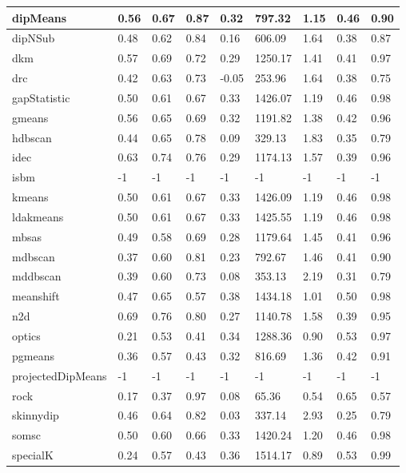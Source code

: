 \begin{table}[H]
\begin{tabular}{|l|l|l|l|l|l|l|l|l|}
dipMeans & 0.56 & 0.67 & 0.87 & 0.32 & 797.32 & 1.15 & 0.46 & 0.90 \\
\hline
dipNSub & 0.48 & 0.62 & 0.84 & 0.16 & 606.09 & 1.64 & 0.38 & 0.87 \\
\hline
dkm & 0.57 & 0.69 & 0.72 & 0.29 & 1250.17 & 1.41 & 0.41 & 0.97 \\
\hline
drc & 0.42 & 0.63 & 0.73 & -0.05 & 253.96 & 1.64 & 0.38 & 0.75 \\
\hline
gapStatistic & 0.50 & 0.61 & 0.67 & 0.33 & 1426.07 & 1.19 & 0.46 & 0.98 \\
\hline
gmeans & 0.56 & 0.65 & 0.69 & 0.32 & 1191.82 & 1.38 & 0.42 & 0.96 \\
\hline
hdbscan & 0.44 & 0.65 & 0.78 & 0.09 & 329.13 & 1.83 & 0.35 & 0.79 \\
\hline
idec & 0.63 & 0.74 & 0.76 & 0.29 & 1174.13 & 1.57 & 0.39 & 0.96 \\
\hline
isbm & -1 & -1 & -1 & -1 & -1 & -1 & -1 & -1 \\
\hline
kmeans & 0.50 & 0.61 & 0.67 & 0.33 & 1426.09 & 1.19 & 0.46 & 0.98 \\
\hline
ldakmeans & 0.50 & 0.61 & 0.67 & 0.33 & 1425.55 & 1.19 & 0.46 & 0.98 \\
\hline
mbsas & 0.49 & 0.58 & 0.69 & 0.28 & 1179.64 & 1.45 & 0.41 & 0.96 \\
\hline
mdbscan & 0.37 & 0.60 & 0.81 & 0.23 & 792.67 & 1.46 & 0.41 & 0.90 \\
\hline
mddbscan & 0.39 & 0.60 & 0.73 & 0.08 & 353.13 & 2.19 & 0.31 & 0.79 \\
\hline
meanshift & 0.47 & 0.65 & 0.57 & 0.38 & 1434.18 & 1.01 & 0.50 & 0.98 \\
\hline
n2d & 0.69 & 0.76 & 0.80 & 0.27 & 1140.78 & 1.58 & 0.39 & 0.95 \\
\hline
optics & 0.21 & 0.53 & 0.41 & 0.34 & 1288.36 & 0.90 & 0.53 & 0.97 \\
\hline
pgmeans & 0.36 & 0.57 & 0.43 & 0.32 & 816.69 & 1.36 & 0.42 & 0.91 \\
\hline
projectedDipMeans & -1 & -1 & -1 & -1 & -1 & -1 & -1 & -1 \\
\hline
rock & 0.17 & 0.37 & 0.97 & 0.08 & 65.36 & 0.54 & 0.65 & 0.57 \\
\hline
skinnydip & 0.46 & 0.64 & 0.82 & 0.03 & 337.14 & 2.93 & 0.25 & 0.79 \\
\hline
somsc & 0.50 & 0.60 & 0.66 & 0.33 & 1420.24 & 1.20 & 0.46 & 0.98 \\
\hline
specialK & 0.24 & 0.57 & 0.43 & 0.36 & 1514.17 & 0.89 & 0.53 & 0.99 \\

\end{tabular}
\end{table}
